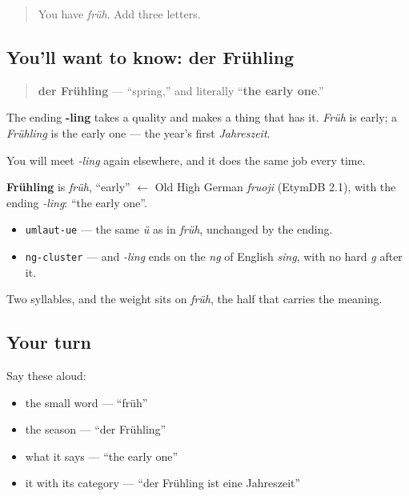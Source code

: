 \label{lesson:GE-C09-fruehling}



\begin{quote}
You have \emph{früh}. Add three letters.
\end{quote}

\subsection*{You'll want to know: der Frühling}
\begin{quote}
\textbf{der Frühling} — \textquotedblleft{}spring,\textquotedblright{} and literally \textquotedblleft{}\textbf{the early one}.\textquotedblright{}
\end{quote}

The ending \textbf{-ling} takes a quality and makes a thing that has it. \emph{Früh} is early; a \emph{Frühling} is the early one — the year's first \emph{Jahreszeit}.

You will meet \emph{-ling} again elsewhere, and it does the same job every time.

\begin{cousinweb}
\textbf{Frühling} is \emph{früh}, \textquotedblleft{}early\textquotedblright{} $\leftarrow$ Old High German \emph{fruoji} (EtymDB 2.1), with the ending \emph{-ling}: \textquotedblleft{}the early one\textquotedblright{}.
\end{cousinweb}

\begin{sounds}
\begin{itemize}
\raggedright
  \item \texttt{umlaut-ue} — the same \emph{ü} as in \emph{früh}, unchanged by the ending.
  \item \texttt{ng-cluster} — and \emph{-ling} ends on the \emph{ng} of English \emph{sing}, with no hard \emph{g} after it.
\end{itemize}

Two syllables, and the weight sits on \emph{früh}, the half that carries the meaning.
\end{sounds}

\subsection*{Your turn}
Say these aloud:

\begin{itemize}
\raggedright
  \item the small word — \textquotedblleft{}früh\textquotedblright{}
  \item the season — \textquotedblleft{}der Frühling\textquotedblright{}
  \item what it says — \textquotedblleft{}the early one\textquotedblright{}
  \item it with its category — \textquotedblleft{}der Frühling ist eine Jahreszeit\textquotedblright{}
\end{itemize}

